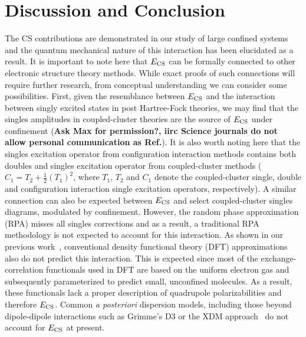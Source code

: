 \documentclass[aps,prl,groupaddress, twocolumn]{revtex4-1}  %
\begin{document}
\section*{Discussion and Conclusion}
The CS contributions are demonstrated in our study of large confined systems and the quantum mechanical nature of this interaction has been elucidated as a result. It is important to note here that $E_{\rm CS}$ can be formally connected to other electronic structure theory methods. While exact proofs of such connections will require further research, from conceptual understanding we can consider some possibilities. First, given the resemblance between $E_{\rm CS}$ and the interaction between singly excited states in post Hartree-Fock theories, we may find that the singles amplitudes in coupled-cluster theories are the source of $E_{\rm CS}$ under confinement\cite{connect_CC} (\textbf{Ask Max for permission?, iirc Science journals do not allow personal communication as Ref.}). It is also worth noting here that the singles excitation operator from configuration interaction methods contains both doubles and singles excitation operator from coupled-cluster methods ($C_1 = T_2 + \frac{1}{2}{(T_1)}^2$, where $T_1$, $T_2$ and $C_1$ denote the coupled-cluster single, double and configuration interaction single excitation operators, respectively). A similar connection can also be expected between $E_{\rm CS}$ and select coupled-cluster singles diagrams, modulated by confinement. However, the random phase approximation (RPA) misses all singles corrections and as a result, a traditional RPA methodology is not expected to account for this interaction. As shown in our previous work~\cite{sadhukhan_prl_2017}, conventional density functional theory (DFT) approximations also do not predict this interaction. This is expected since most of the exchange-correlation functionals used in DFT are  based on the uniform electron gas and subsequently parameterized to predict small, unconfined molecules. As a result, these functionals lack a proper description of quadrupole polarizabilities and therefore  $E_{\rm CS}$. Common \textit{a posteriori} dispersion models, including those beyond dipole-dipole interactions such as Grimme's D3\cite{grimme_2010} or the XDM approach~\cite{becke_2006,angyan_2007,ayers_2009,heselmann_2009} do not account for $E_{\rm CS}$ at present.
\end{document}
